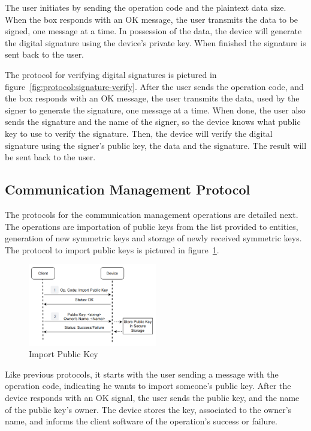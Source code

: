 The user initiates by sending the operation code and the plaintext data size.
When the box responds with an OK message, the user transmits the data to be signed, one message at a time.
In possession of the data, the device will generate the digital signature using the device's private key. When finished the signature is sent back to the user.

The protocol for verifying digital signatures is pictured in figure~\ref{fig:protocol:signature-verify}.
After the user sends the operation code, and the box responds with an OK message, the user transmits the data, used by the signer to generate the signature, one message at a time.
When done, the user also sends the signature and the name of the signer, so the device knows what public key to use to verify the signature.
Then, the device will verify the digital signature using the signer's public key, the data and the signature. The result will be sent back to the user.

\subsection{Communication Management Protocol}\label{chap:implementation:protocol:key}

The protocols for the communication management operations are detailed next. The operations are importation of public keys from the list provided to entities, generation of new symmetric keys and storage of newly received symmetric keys.
The protocol to import public keys is pictured in figure~\ref{fig:protocol:import-pub}.

\begin{figure}[h]
	\centering
	\includegraphics[width=0.5\textwidth]{./Images/import-pub-key.png}
	\caption{Import Public Key}\label{fig:protocol:import-pub}
\end{figure}

Like previous protocols, it starts with the user sending a message with the operation code, indicating he wants to import someone's public key.
After the device responds with an OK signal, the user sends the public key, and the name of the public key's owner.
The device stores the key, associated to the owner's name, and informs the client software of the operation's success or failure.

